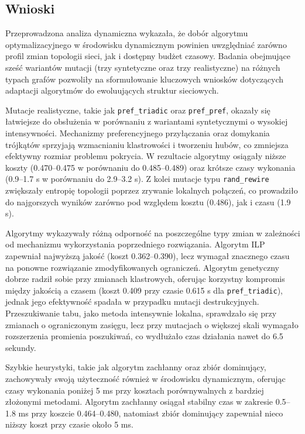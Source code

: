 \subsection{Wnioski}
Przeprowadzona analiza dynamiczna wykazała, że dobór algorytmu optymalizacyjnego w środowisku dynamicznym powinien uwzględniać zarówno profil zmian topologii sieci, jak i dostępny budżet czasowy. Badania obejmujące sześć wariantów mutacji (trzy syntetyczne oraz trzy realistyczne) na różnych typach grafów pozwoliły na sformułowanie kluczowych wniosków dotyczących adaptacji algorytmów do ewoluujących struktur sieciowych.

Mutacje realistyczne, takie jak \texttt{pref\_triadic} oraz \texttt{pref\_pref}, okazały się łatwiejsze do obsłużenia w porównaniu z wariantami syntetycznymi o wysokiej intensywności. Mechanizmy preferencyjnego przyłączania oraz domykania trójkątów sprzyjają wzmacnianiu klastrowości i tworzeniu hubów, co zmniejsza efektywny rozmiar problemu pokrycia. W rezultacie algorytmy osiągały niższe koszty (0.470--0.475 w porównaniu do 0.485--0.489) oraz krótsze czasy wykonania (0.9--1.7 s w porównaniu do 2.9--3.2 s). Z kolei mutacje typu \texttt{rand\_rewire} zwiększały entropię topologii poprzez zrywanie lokalnych połączeń, co prowadziło do najgorszych wyników zarówno pod względem kosztu (0.486), jak i czasu (1.9 s).

Algorytmy wykazywały różną odporność na poszczególne typy zmian w zależności od mechanizmu wykorzystania poprzedniego rozwiązania. Algorytm ILP zapewniał najwyższą jakość (koszt 0.362--0.390), lecz wymagał znacznego czasu na ponowne rozwiązanie zmodyfikowanych ograniczeń. Algorytm genetyczny dobrze radził sobie przy zmianach klastrowych, oferując korzystny kompromis między jakością a czasem (koszt 0.409 przy czasie 0.615 s dla \texttt{pref\_triadic}), jednak jego efektywność spadała w przypadku mutacji destrukcyjnych. Przeszukiwanie tabu, jako metoda intensywnie lokalna, sprawdzało się przy zmianach o ograniczonym zasięgu, lecz przy mutacjach o większej skali wymagało rozszerzenia promienia poszukiwań, co wydłużało czas działania nawet do 6.5 sekundy.

Szybkie heurystyki, takie jak algorytm zachłanny oraz zbiór dominujący, zachowywały swoją użyteczność również w środowisku dynamicznym, oferując czasy wykonania poniżej 5 ms przy kosztach porównywalnych z bardziej złożonymi metodami. Algorytm zachłanny osiągał stabilny czas w zakresie 0.5--1.8 ms przy koszcie 0.464--0.480, natomiast zbiór dominujący zapewniał nieco niższy koszt przy czasie około 5 ms.

